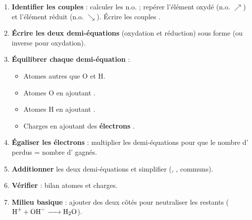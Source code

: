 \documentclass[11pt]{article}
\begin{document}
\begin{methode}
\begin{enumerate}
\item \textbf{Identifier les couples} : calculer les n.o. ; repérer l'élément oxydé (n.o. $\nearrow$) et l'élément réduit (n.o. $\searrow$). Écrire les couples .
\item \textbf{Écrire les deux demi-équations} (oxydation et réduction) sous forme  (ou inverse pour oxydation).
\item \textbf{Équilibrer chaque demi-équation} :
  \begin{itemize}
  \item Atomes autres que O et H.
  \item Atomes O en ajoutant .
  \item Atomes H en ajoutant .
  \item Charges en ajoutant des \textbf{électrons }.
  \end{itemize}
\item \textbf{Égaliser les électrons} : multiplier les demi-équations pour que le nombre d' perdus = nombre d' gagnés.
\item \textbf{Additionner} les deux demi-équations et simplifier (, ,  communs).
\item \textbf{Vérifier} : bilan atomes et charges.
\item \textbf{Milieu basique} : ajouter  des deux côtés pour neutraliser les  restants ($\ce{H+ + OH- -> H2O}$).
\end{enumerate}
\end{methode}
\end{document}
